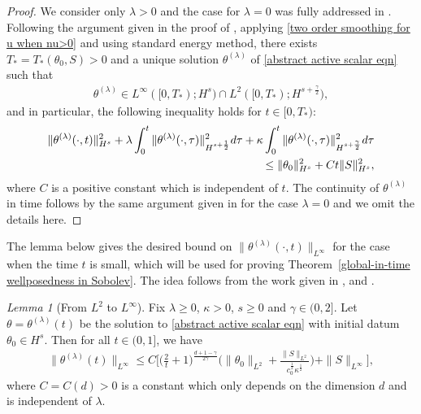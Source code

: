 \documentclass[reqno]{amsart}%
\theoremstyle{definition}
\theoremstyle{remark}
\numberwithin{equation}{section}
\newtheorem{lemma}[theorem]{Lemma}
\newcommand{\thetalambda}{\theta^{(\lambda)}}
\newcommand{\1}{\mathbf{1}}
\numberwithin{equation}{section}
\numberwithin{theorem}{section}
\numberwithin{figure}{section}
\begin{document}
\begin{proof}
We consider only $\lambda >0$ and the case for $\lambda=0$ was fully addressed in \cite{FS21}. Following the argument given in the proof of \cite[Theorem~3.1]{FRV12}, applying \eqref{two order smoothing for u when nu>0} and using standard energy method, there exists $T_*=T_*(\theta_0,S)>0$ and a unique solution $\theta^{(\lambda)}$ of \eqref{abstract active scalar eqn} such that
\begin{align*}
\theta^{(\lambda)}\in L^\infty([0,T_*);H^s)\cap L^2([0,T_*);H^{s+\frac{\gamma}{2}}),
\end{align*}
and in particular, the following inequality holds for $t\in[0,T_*)$:
\begin{align}\label{H^s bound on theta with S and higher norm}
\|\theta^{(\lambda)}(\cdot,t)\|^2_{H^s}+\lambda\int_0^t\|\theta^{(\lambda)}(\cdot,\tau)\|^2_{H^{s+\frac{1}{2}}}d\tau+\kappa\int_0^t\|\theta^{(\lambda)}(\cdot,\tau)\|^2_{H^{s+\frac{\gamma}{2}}}d\tau\notag\\
\le \|\theta_0\|^2_{H^s}+Ct\|S\|^2_{H^s},
\end{align}
where $C$ is a positive constant which is independent of $t$. The continuity of $\theta^{(\lambda)}$ in time follows by the same argument given in \cite{FS21} for the case $\lambda=0$ and we omit the details here.
\end{proof}

The lemma below gives the desired bound on $\|\theta^{(\lambda)}(\cdot,t)\|_{L^\infty}$ for the case when the time $t$ is small, which will be used for proving Theorem~\ref{global-in-time wellposedness in Sobolev}. The idea follows from the work given in \cite{CV10}, \cite{CZV16} and \cite{FS21}.
\begin{lemma}[From $L^2$ to $L^\infty$]\label{De Giorgi iteration lemma}
Fix $\lambda\ge0$, $\kappa>0$, $s\ge0$ and $\gamma\in(0,2]$. Let $\theta=\thetalambda(t)$ be the solution to \eqref{abstract active scalar eqn} with initial datum $\theta_0\in H^s$. Then for all $t\in(0,1]$, we have
\begin{align}\label{infty bound on theta in terms of L2 norm of initial theta}
\|\thetalambda(t)\|_{L^\infty}\le C\Big[\Big(\frac{2}{t}+1\Big)^{\frac{d+1-\gamma}{2\gamma}}\Big(\|\theta_0\|_{L^2}+\frac{\|S\|_{L^2}}{c_0^\frac{1}{2}\kappa^\frac{1}{2}}\Big)+\|S\|_{L^\infty}\Big],
\end{align}
where $C=C(d)>0$ is a constant which only depends on the dimension $d$ and is independent of $\lambda$.
\end{lemma}
\end{document}
